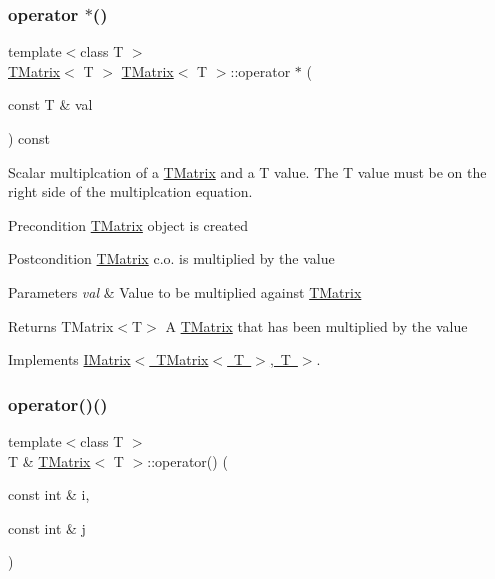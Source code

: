 \subsubsection{\texorpdfstring{operator $\ast$()}{operator *()}}
{\footnotesize\ttfamily template$<$class T $>$ \\
\mbox{\hyperlink{class_t_matrix}{T\+Matrix}}$<$ T $>$ \mbox{\hyperlink{class_t_matrix}{T\+Matrix}}$<$ T $>$\+::operator $\ast$ (\begin{DoxyParamCaption}\item[{const T \&}]{val }\end{DoxyParamCaption}) const\hspace{0.3cm}{\ttfamily [virtual]}}



Scalar multiplcation of a \mbox{\hyperlink{class_t_matrix}{T\+Matrix}} and a T value. The T value must be on the right side of the multiplcation equation. 

\begin{DoxyPrecond}{Precondition}
\mbox{\hyperlink{class_t_matrix}{T\+Matrix}} object is created 
\end{DoxyPrecond}
\begin{DoxyPostcond}{Postcondition}
\mbox{\hyperlink{class_t_matrix}{T\+Matrix}} c.\+o. is multiplied by the value 
\end{DoxyPostcond}

\begin{DoxyParams}{Parameters}
{\em val} & Value to be multiplied against \mbox{\hyperlink{class_t_matrix}{T\+Matrix}} \\
\hline
\end{DoxyParams}
\begin{DoxyReturn}{Returns}
T\+Matrix$<$\+T$>$ A \mbox{\hyperlink{class_t_matrix}{T\+Matrix}} that has been multiplied by the value 
\end{DoxyReturn}


Implements \mbox{\hyperlink{class_i_matrix_a10121e038635bdf33552c6a1fb288398}{I\+Matrix$<$ T\+Matrix$<$ T $>$, T $>$}}.

\mbox{\label{class_t_matrix_a4fa62998b2fe8babbc78f80c230fca45}} 
\subsubsection{\texorpdfstring{operator()()}{operator()()}\hspace{0.1cm}{\footnotesize\ttfamily [1/2]}}
{\footnotesize\ttfamily template$<$class T $>$ \\
T \& \mbox{\hyperlink{class_t_matrix}{T\+Matrix}}$<$ T $>$\+::operator() (\begin{DoxyParamCaption}\item[{const int \&}]{i,  }\item[{const int \&}]{j }\end{DoxyParamCaption})\hspace{0.3cm}{\ttfamily [virtual]}}



